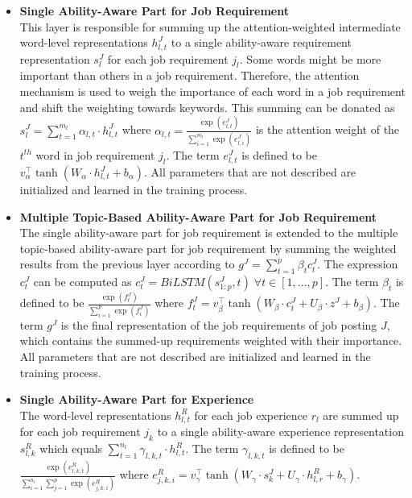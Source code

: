 \documentclass[draft,final]{thesisclass} %
\begin{document}
\begin{itemize}
\begin{itemize}
        \item \textbf{Single Ability-Aware Part for Job Requirement}\\
        This layer is responsible for summing up the attention-weighted intermediate word-level representations $h^J_{l,t}$ to a single ability-aware requirement representation $s^J_l$ for each job requirement $j_l$.
        Some words might be more important than others in a job requirement. Therefore, the attention mechanism is used to weigh the importance of each word in a job requirement and shift the weighting towards keywords.
        This summing can be donated as $s^J_l = \sum_{t=1}^{m_l} \alpha_{l,t} \cdot h^J_{l,t}$ where $\alpha_{l,t} = \frac{\exp(e^J_{l,t})}{\sum_{i=1}^{m_l} \exp(e^J_{l,i})}$ is the attention weight of the $t^{th}$ word in job requirement $j_l$.
        The term $e^J_{l,t}$ is defined to be $v_{\alpha}^{\intercal} \tanh(W_{\alpha} \cdot h^J_{l,t} + b_{\alpha})$.
        All parameters that are not described are initialized and learned in the training process.
        \item \textbf{Multiple Topic-Based Ability-Aware Part for Job Requirement}\\
        The single ability-aware part for job requirement is extended to the multiple topic-based ability-aware part for job requirement by summing the weighted results from the previous layer according to $g^J = \sum_{t=1}^p \beta_t c_t^J$.
        The expression $c_t^J$ can be computed as $c_t^J = BiLSTM(s^J_{1:p},t) \; \forall t \in [1,...,p]$.
        The term $\beta_t$ is defined to be $\frac{\exp(f^J_t)}{\sum_{i=1}^p \exp(f^J_i)}$ where $f^J_t = v_{\beta}^{\intercal} \tanh(W_{\beta} \cdot c_t^J + U_\beta \cdot z^J + b_{\beta})$.
        The term $g^J$ is the final representation of the job requirements of job posting $J$, which contains the summed-up requirements weighted with their importance.
        All parameters that are not described are initialized and learned in the training process.
        \item \textbf{Single Ability-Aware Part for Experience}\\
        The word-level representations $h^R_{l,t}$ for each job experience $r_l$ are summed up for each job requirement $j_k$ to a single ability-aware experience representation $s^R_{l,k}$ which equals $\sum_{t=1}^{n_l} \gamma_{l,k,t} \cdot h^R_{l,t}$.
        The term $\gamma_{l,k,t}$ is defined to be $\frac{\exp(e^R_{l,k,t})}{\sum_{i=1}^{n_l} \sum^p_{j=1} \exp(e^R_{j,k,i})}$ where $e^R_{j,k,i} = v_{\gamma}^{\intercal} \tanh(W_{\gamma} \cdot s^J_{k} + U_\gamma \cdot h^R_{l,r} + b_{\gamma})$.

\end{itemize}
\end{itemize}
\end{document}
